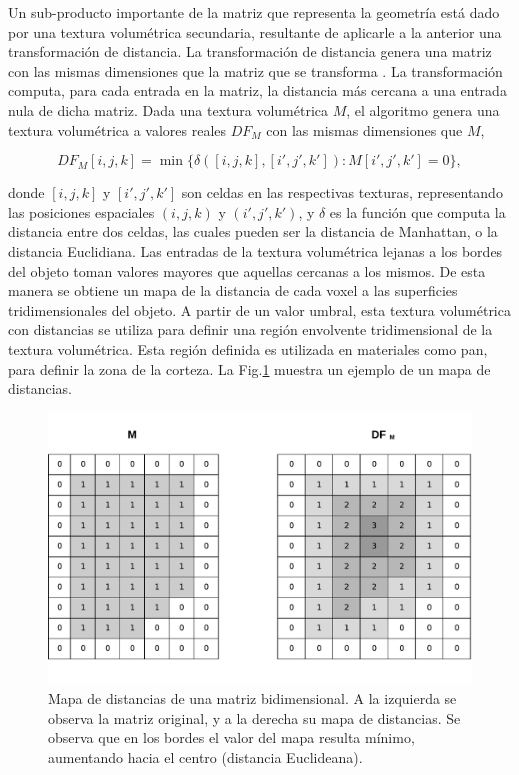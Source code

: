 Un sub-producto importante de la matriz que representa la geometría está dado por una textura volumétrica secundaria, resultante de aplicarle a la anterior una transformación de distancia.
La transformación de distancia genera una matriz con las mismas dimensiones que la matriz que se transforma \cite{osh03}.
La transformación computa, para cada entrada en la matriz, la distancia más cercana a una entrada nula de dicha matriz.
Dada una textura volumétrica $M$, el algoritmo genera una textura volumétrica a valores reales $DF_{M}$ con las mismas dimensiones que $M$,


$$DF_{M}[i,j,k] = \min \bigg\{ \delta([i,j,k],[i',j',k']): M[i',j',k'] = 0 \bigg\},$$


\noindent donde $[i,j,k]$ y $[i',j',k']$ son celdas en las respectivas texturas, representando las posiciones espaciales $(i,j,k)$ y $(i',j',k')$, y $\delta$ es la función que computa la distancia entre dos celdas, las cuales pueden ser la distancia de Manhattan, o la distancia Euclidiana.
Las entradas de la textura volumétrica lejanas a los bordes del objeto toman valores mayores que aquellas cercanas a los mismos.
De esta manera se obtiene un mapa de la distancia de cada voxel a las superficies tridimensionales del objeto.
A partir de un valor umbral, esta textura volumétrica con distancias se utiliza para definir una región envolvente tridimensional de la textura volumétrica.
Esta región definida es utilizada en materiales como pan, para definir la zona de la corteza.
La Fig.\ref{fg:distance} muestra un ejemplo de un mapa de distancias.

\begin{figure}
\includegraphics[width=12cm]{figures/DistanceTransform}
\caption[Mapa de distancias de una matriz bidimensional]{Mapa de distancias de una matriz bidimensional. A la izquierda se observa la matriz original, y a la derecha su mapa de distancias. Se observa que en los bordes el valor del mapa resulta mínimo, aumentando hacia el centro (distancia Euclideana).}
\label{fg:distance}
\end{figure}

